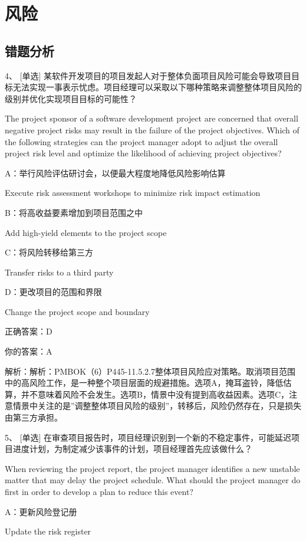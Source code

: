 
\chapter{风险}

\section{错题分析}

4、 [单选] 某软件开发项目的项目发起人对于整体负面项目风险可能会导致项目目标无法实现一事表示忧虑。项目经理可以采取以下哪种策略来调整整体项目风险的级别并优化实现项目目标的可能性？

The project sponsor of a software development project are concerned that overall negative project risks may result in the failure of the project objectives. Which of the following strategies can the project manager adopt to adjust the overall project risk level and optimize the likelihood of achieving project objectives?

A：举行风险评估研讨会，以便最大程度地降低风险影响估算

Execute risk assessment workshops to minimize risk impact estimation

B：将高收益要素增加到项目范围之中

Add high-yield elements to the project scope

C：将风险转移给第三方

Transfer risks to a third party

D：更改项目的范围和界限

Change the project scope and boundary

正确答案：D

你的答案：A

解析：解析：PMBOK（6）P445-11.5.2.7整体项目风险应对策略。取消项目范围中的高风险工作，是一种整个项目层面的规避措施。选项A，掩耳盗铃，降低估算，并不意味着风险不会发生。选项B，情景中没有提到高收益因素。选项C，注意情景中关注的是”调整整体项目风险的级别”，转移后，风险仍然存在，只是损失由第三方承担。


5、 [单选] 在审查项目报告时，项目经理识别到一个新的不稳定事件，可能延迟项目进度计划，为制定减少该事件的计划，项目经理首先应该做什么？

When reviewing the project report, the project manager identifies a new unstable matter that may delay the project schedule. What should the project manager do first in order to develop a plan to reduce this event?

A：更新风险登记册

Update the risk register

